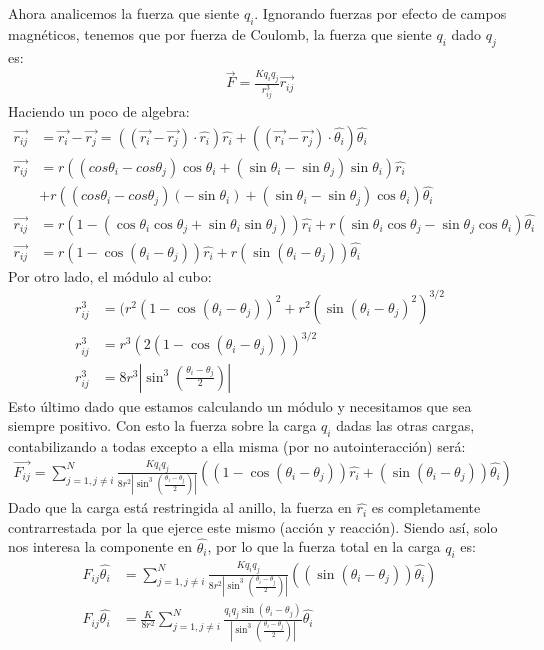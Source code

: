 \documentclass[12pt]{article}
\begin{document}
Ahora analicemos la fuerza que siente $q_i$. Ignorando fuerzas por efecto de campos magnéticos, tenemos que por fuerza de Coulomb, la fuerza que siente $q_i$ dado $q_j$ es:
\begin{align*}
\vec{F}=\frac{Kq_iq_j}{r_{ij}^3}\vec{r_{ij}}
\end{align*}
Haciendo un poco de algebra:
\begin{align*}
\vec{r_{ij}}&=\vec{r_i}-\vec{r_j}=((\vec{r_i}-\vec{r_j})\cdot{\hat{r_i}})\hat{r_i}+((\vec{r_i}-\vec{r_j})\cdot\hat{\theta_i})\hat{\theta_i} \\
\vec{r_{ij}}&=r((cos\theta_i-cos\theta_j)\cos\theta_i+(\sin\theta_i-\sin\theta_j)\sin\theta_i)\hat{r_i}\\&+r((cos\theta_i-cos\theta_j)(-\sin\theta_i)+(\sin\theta_i-\sin\theta_j)\cos\theta_i)\hat{\theta_i}\\
\vec{r_{ij}}&=r(1-(\cos\theta_i\cos\theta_j+\sin\theta_i\sin\theta_j))\hat{r_i}+r(\sin\theta_i\cos\theta_j-\sin\theta_j\cos\theta_i)\hat{\theta_i}\\
\vec{r_{ij}}&=r(1-\cos(\theta_i-\theta_j))\hat{r_i}+r(\sin(\theta_i-\theta_j))\hat{\theta_i}
\end{align*}
Por otro lado, el módulo al cubo:
\begin{align*}
r_{ij}^3&=(r^2(1-\cos(\theta_i-\theta_j))^2+r^2(\sin(\theta_i-\theta_j)^2)^{3/2}\\
r_{ij}^3&=r^3(2(1-\cos(\theta_i-\theta_j)))^{3/2}\\
r_{ij}^3&=8r^3\left|\sin^3\left(\frac{\theta_i-\theta_j}{2}\right)\right|
\end{align*}
Esto último dado que estamos calculando un módulo y necesitamos que sea siempre positivo.
Con esto la fuerza sobre la carga $q_i$ dadas las otras cargas, contabilizando a todas excepto a ella misma (por no autointeracción) será:
\begin{align*}
\vec{F_{ij}}=\sum_{j=1,j\neq i}^N \frac{Kq_iq_j}{8r^2\left|\sin^3\left(\frac{\theta_i-\theta_j}{2}\right)\right|}((1-\cos(\theta_i-\theta_j))\hat{r_i}+(\sin(\theta_i-\theta_j))\hat{\theta_i})
\end{align*} 
Dado que la carga está restringida al anillo, la fuerza en $\hat{r_i}$ es completamente contrarrestada por la que ejerce este mismo (acción y reacción). Siendo así, solo nos interesa la componente en $\hat{\theta_i}$, por lo que la fuerza total en la carga $q_i$ es:
\begin{align*}
F_{ij}\hat{\theta_i}&=\sum_{j=1,j\neq i}^N \frac{Kq_iq_j}{8r^2\left|\sin^3\left(\frac{\theta_i-\theta_j}{2}\right)\right|}((\sin(\theta_i-\theta_j))\hat{\theta_i})\\
F_{ij}\hat{\theta_i}&=\frac{K}{8r^2}\sum_{j=1,j\neq i}^N \frac{q_iq_j\sin(\theta_i-\theta_j)}{\left|\sin^3\left(\frac{\theta_i-\theta_j}{2}\right)\right|}\hat{\theta_i}
\end{align*}
\end{document}
